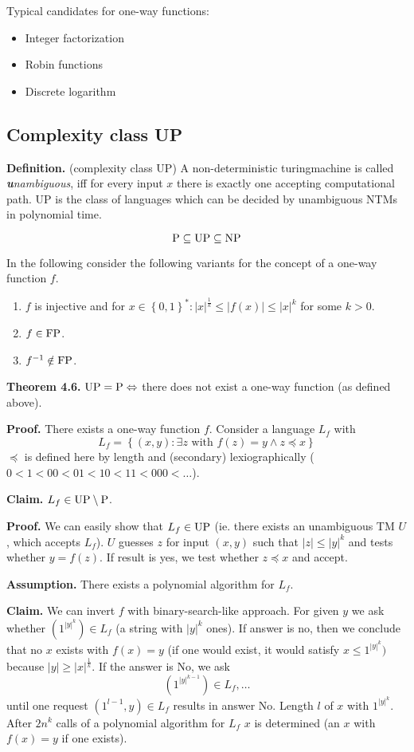 \documentclass[a4paper]{article}
\newcommand{\cls}[1]{\rm{#1}}
\newcommand{\set}[1]{\left\{#1\right\}}
\begin{document}
Typical candidates for one-way functions:
\begin{itemize}
  \item Integer factorization
  \item Robin functions
  \item Discrete logarithm
\end{itemize}

\subsection{Complexity class UP}
\label{class:up}
%
\textbf{Definition.} (complexity class \cls{UP})
A non-deterministic turingmachine is called \emph{\textbf{u}nambiguous}, iff
for every input $x$ there is exactly one accepting
computational path. UP is the class of languages which can be decided
by unambiguous NTMs in polynomial time.

\[
  \cls{P} \subseteq \cls{UP} \subseteq \cls{NP}
\]

In the following consider the following variants for the concept of a
one-way function $f$.
\begin{enumerate}
  \item $f$ is injective and for $x \in \set{0,1}^*: |x|^{\frac1{k}} \leq
        |f(x)| \leq |x|^k$ for some $k > 0$.
  \item $f \in \cls{FP}$.
  \item $f^{-1} \notin \cls{FP}$.
\end{enumerate}

\textbf{Theorem 4.6.} $\cls{UP} = \cls{P} \Leftrightarrow$ there does not
exist a one-way function (as defined above).

\textbf{Proof.}
There exists a one-way function $f$. Consider a language $L_f$ with
\[
  L_f = \set{(x,y) : \exists z \text{ with } f(z) = y \land z \preccurlyeq x}
\]
$\preccurlyeq$ is defined here by length and (secondary) lexiographically
($0 < 1 < 00 < 01 < 10 < 11 < 000 < \ldots$).

\textbf{Claim.} $L_f \in \cls{UP} \setminus \cls{P}$.

\textbf{Proof.}
We can easily show that $L_f \in \cls{UP}$ (ie. there exists an unambiguous
TM $U$, which accepts $L_f$). $U$ guesses $z$ for input $(x, y)$ such that
$|z| \leq |y|^k$ and tests whether $y = f(z)$. If result is yes, we test
whether $z \preccurlyeq x$ and accept.

\textbf{Assumption.}
There exists a polynomial algorithm for $L_f$.

\textbf{Claim.}
We can invert $f$ with binary-search-like approach. For given $y$ we ask
whether $(1^{|y|^k}) \in L_f$ (a string with $|y|^k$ ones). If answer is
no, then we conclude that no $x$ exists with $f(x) = y$ (if one would exist,
it would satisfy $x \leq 1^{|y|^k})$ because $|y| \geq |x|^{\frac1{k}}$.
If the answer is No, we ask
\[
    (1^{|y|^{k-1}}) \in L_f, \ldots
\]
until one request $(1^{l-1}, y) \in L_f$ results in answer No. Length $l$
of $x$ with $1^{|y|^k}$. After $2n^k$ calls of a polynomial algorithm for
$L_f$ $x$ is determined (an $x$ with $f(x) = y$ if one exists).
\end{document}
